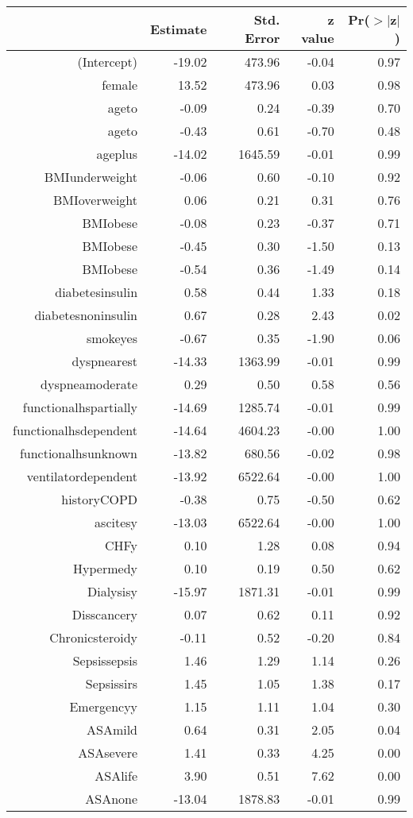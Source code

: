 \bigskip\bigskip
\centering
\begin{tabular}{rrrrr}
  \hline
 & Estimate & Std. Error & z value & Pr($>$$|$z$|$) \\ 
  \hline
(Intercept) & -19.02 & 473.96 & -0.04 & 0.97 \\ 
  female & 13.52 & 473.96 & 0.03 & 0.98 \\ 
  age\-65\-to\-74 & -0.09 & 0.24 & -0.39 & 0.70 \\ 
  age\-75\-to\-84 & -0.43 & 0.61 & -0.70 & 0.48 \\ 
  age\-85\-plus & -14.02 & 1645.59 & -0.01 & 0.99 \\ 
  BMI\-underweight & -0.06 & 0.60 & -0.10 & 0.92 \\ 
  BMI\-overweight & 0.06 & 0.21 & 0.31 & 0.76 \\ 
  BMI\-obese\-1 & -0.08 & 0.23 & -0.37 & 0.71 \\ 
  BMI\-obese\-2 & -0.45 & 0.30 & -1.50 & 0.13 \\ 
  BMI\-obese\-3 & -0.54 & 0.36 & -1.49 & 0.14 \\ 
  diabetes\-insulin & 0.58 & 0.44 & 1.33 & 0.18 \\ 
  diabetes\-noninsulin & 0.67 & 0.28 & 2.43 & 0.02 \\ 
  smoke\-yes & -0.67 & 0.35 & -1.90 & 0.06 \\ 
  dyspnea\-rest & -14.33 & 1363.99 & -0.01 & 0.99 \\ 
  dyspnea\-moderate & 0.29 & 0.50 & 0.58 & 0.56 \\ 
  functional\-hs\-partially & -14.69 & 1285.74 & -0.01 & 0.99 \\ 
  functional\-hs\-dependent & -14.64 & 4604.23 & -0.00 & 1.00 \\ 
  functional\-hs\-unknown & -13.82 & 680.56 & -0.02 & 0.98 \\ 
  ventilator\-dependent & -13.92 & 6522.64 & -0.00 & 1.00 \\ 
  history\-COPD & -0.38 & 0.75 & -0.50 & 0.62 \\ 
  ascites\-y & -13.03 & 6522.64 & -0.00 & 1.00 \\ 
  CHF\-y & 0.10 & 1.28 & 0.08 & 0.94 \\ 
  Hyper\-med\-y & 0.10 & 0.19 & 0.50 & 0.62 \\ 
  Dialysis\-y & -15.97 & 1871.31 & -0.01 & 0.99 \\ 
  Diss\-cancer\-y & 0.07 & 0.62 & 0.11 & 0.92 \\ 
  Chronic\-steroid\-y & -0.11 & 0.52 & -0.20 & 0.84 \\ 
  Sepsis\-sepsis & 1.46 & 1.29 & 1.14 & 0.26 \\ 
  Sepsis\-sirs & 1.45 & 1.05 & 1.38 & 0.17 \\ 
  Emergency\-y & 1.15 & 1.11 & 1.04 & 0.30 \\ 
  ASA\-mild & 0.64 & 0.31 & 2.05 & 0.04 \\ 
  ASA\-severe & 1.41 & 0.33 & 4.25 & 0.00 \\ 
  ASA\-life & 3.90 & 0.51 & 7.62 & 0.00 \\ 
  ASA\-none & -13.04 & 1878.83 & -0.01 & 0.99 \\ 
   \hline
\end{tabular}
